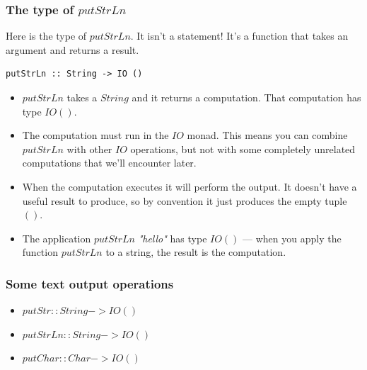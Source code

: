 \documentclass{beamer}
\begin{document}
\begin{frame}[fragile]
\frametitle{The type of $putStrLn$}

Here is the type of $putStrLn$.  It isn't a statement!  It's a
function that takes an argument and returns a result.

\begin{verbatim}
putStrLn :: String -> IO ()
\end{verbatim}

\begin{itemize}
\item $putStrLn$ takes a $String$ and it returns a computation.
  That computation has type $IO ()$.
\item The computation must run in the $IO$ monad.  This means you
  can combine $putStrLn$ with other $IO$ operations, but not with
  some completely unrelated computations that we'll encounter
  later.
\item When the computation executes it will perform the output.  It
  doesn't have a useful result to produce, so by convention it just
  produces the empty tuple $()$.
\item The application $putStrLn$\emph{ "hello"} has type $IO ()$ --- when
  you apply the function $putStrLn$ to a string, the result is the
  computation.
\end{itemize}

\end{frame}

\begin{frame}[fragile]
\frametitle{Some text output operations}

\begin{itemize}
\item $putStr :: String -> IO ()$
\item $putStrLn :: String -> IO ()$
\item $putChar :: Char -> IO ()$
\end{itemize}

\end{frame}
\end{document}
